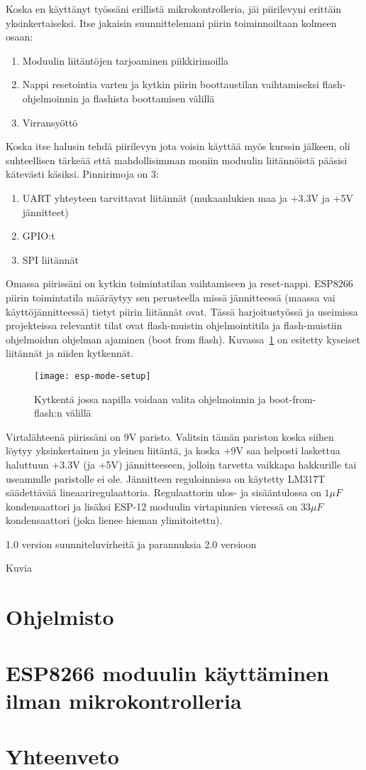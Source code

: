 Koska en käyttänyt työssäni erillistä mikrokontrolleria, jäi piirilevyni
erittäin yksinkertaiseksi. Itse jakaisin suunnittelemani piirin toiminnoiltaan
kolmeen osaan:
\begin{enumerate}
  \item Moduulin liitäntöjen tarjoaminen piikkirimoilla
  \item Nappi resetointia varten ja kytkin piirin boottaustilan vaihtamiseksi
    flash-ohjelmoinnin ja flashista boottamisen välillä
  \item Virransyöttö
\end{enumerate}

Koska itse halusin tehdä piirilevyn jota voisin käyttää myös kurssin jälkeen,
oli suhteellisen tärkeää että mahdollisimman moniin moduulin liitännöistä
pääsisi kätevästi käsiksi. Pinnirimoja on 3:
\begin{enumerate}
  \item UART yhteyteen tarvittavat liitännät (mukaanlukien maa ja +3.3V ja +5V
    jännitteet)
  \item GPIO:t
  \item SPI liitännät
\end{enumerate}

Omassa piirissäni on kytkin toimintatilan vaihtamiseen ja reset-nappi.
ESP8266 piirin toimintatila määräytyy sen perusteella missä jännitteessä
(maassa vai käyttöjännitteessä) tietyt piirin liitännät ovat. Tässä
harjoitustyössä ja useimissa projekteissa relevantit tilat ovat flash-muistin
ohjelmointitila ja flash-muistiin ohjelmoidun ohjelman ajaminen (boot from
flash). Kuvassa~\ref{fig:esp-tila-pinnit} on esitetty kyseiset liitännät ja
niiden kytkennät.
\begin{figure}[H]
  \centering
  \texttt{[image: esp-mode-setup]}
  \caption{Kytkentä jossa napilla voidaan valita ohjelmoinnin ja boot-from-flash:n
    välillä~\cite{hackaday}}
\label{fig:esp-tila-pinnit}
\end{figure}

Virtalähteenä piirissäni on 9V paristo. Valitsin tämän pariston koska siihen
löytyy yksinkertainen ja yleinen liitäntä, ja koska +9V saa helposti laskettua
haluttuun +3.3V (ja +5V) jännitteeseen, jolloin tarvetta vaikkapa hakkurille
tai useammlle paristolle ei ole. Jännitteen reguloinnissa on käytetty LM317T
säädettävää lineaariregulaattoria. Regulaattorin ulos- ja sisääntulossa on
\(1\mu{}F\) kondensaattori ja lisäksi ESP-12 moduulin virtapinnien vieressä on
\(33\mu{}F\) kondensaattori (joka lienee hieman ylimitoitettu).

1.0 version suunniteluvirheitä ja parannuksia 2.0 versioon

Kuvia

\section{Ohjelmisto}

\section{ESP8266 moduulin käyttäminen ilman mikrokontrolleria}
\label{sec:extra}

\section{Yhteenveto}
